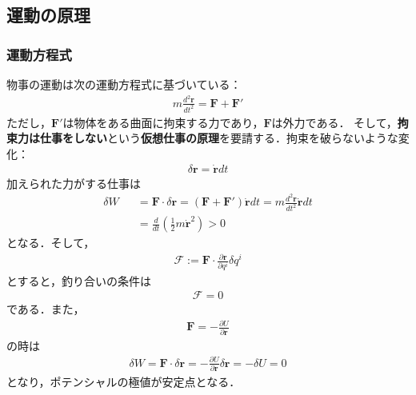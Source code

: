 \documentclass[../Main.tex]{subfiles}
\begin{document}
\subsection{運動の原理}
\subsubsection{運動方程式}
物事の運動は次の運動方程式に基づいている：
\begin{eqnarray}
  m\frac{d^2\bm{r}}{dt^2} = \bm{F} + \bm{F}' \label{equation_motion}
\end{eqnarray}
ただし，$\bm{F}'$は物体をある曲面に拘束する力であり，$\bm{F}$は外力である．
そして，\textbf{拘束力は仕事をしない}という\textbf{仮想仕事の原理}を要請する．拘束を破らないような変化：
\begin{eqnarray}
  \delta\bm{r} = \dot{\bm{r}}dt
\end{eqnarray}
加えられた力がする仕事は
\begin{eqnarray}
  \delta W &&= \bm{F}\cdot \delta\bm{r} = \left( \bm{F} + \bm{F}' \right)\dot{\bm{r}}dt = m\frac{d^2\bm{r}}{dt^2}\dot{\bm{r}}dt\\
  &&=\frac{d}{dt} \left( \frac{1}{2}m\dot{\bm{r}}^2 \right)>0
\end{eqnarray}
となる．そして，
\begin{eqnarray}
  \mathcal{F} := \bm{F}\cdot\frac{\partial \bm{r}}{\partial q^i}\delta q^i  
\end{eqnarray}
とすると，釣り合いの条件は
\begin{eqnarray}
  \mathcal{F}= 0
\end{eqnarray}
である．また，
\begin{eqnarray}
  \bm{F} = -\frac{\partial U}{\partial \bm{r}}
\end{eqnarray}
の時は
\begin{eqnarray}
  \delta W = \bm{F}\cdot \delta\bm{r} =  -\frac{\partial U}{\partial \bm{r}}\delta\bm{r} = -\delta U =0
\end{eqnarray}
となり，ポテンシャルの極値が安定点となる．
\end{document}
